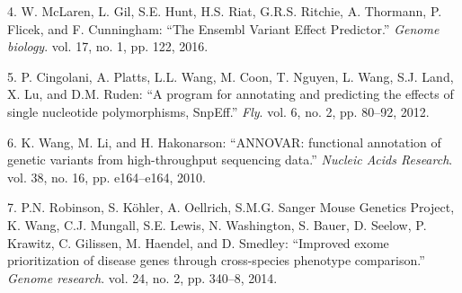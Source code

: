 \documentclass[12pt,twoside]{reedthesis}
\theoremstyle{definition}
\theoremstyle{definition}
\theoremstyle{remark}
\begin{document}
  \hypertarget{ref-McLaren2016}{}
  4. W. McLaren, L. Gil, S.E. Hunt, H.S. Riat, G.R.S. Ritchie, A.
  Thormann, P. Flicek, and F. Cunningham: ``The Ensembl Variant Effect
  Predictor.'' \emph{Genome biology}. vol. 17, no. 1, pp. 122, 2016.
  
  \hypertarget{ref-Cingolani2012}{}
  5. P. Cingolani, A. Platts, L.L. Wang, M. Coon, T. Nguyen, L. Wang, S.J.
  Land, X. Lu, and D.M. Ruden: ``A program for annotating and predicting
  the effects of single nucleotide polymorphisms, SnpEff.'' \emph{Fly}.
  vol. 6, no. 2, pp. 80--92, 2012.
  
  \hypertarget{ref-Wang2010}{}
  6. K. Wang, M. Li, and H. Hakonarson: ``ANNOVAR: functional annotation
  of genetic variants from high-throughput sequencing data.''
  \emph{Nucleic Acids Research}. vol. 38, no. 16, pp. e164--e164, 2010.
  
  \hypertarget{ref-Robinson2014}{}
  7. P.N. Robinson, S. Köhler, A. Oellrich, S.M.G. Sanger Mouse Genetics
  Project, K. Wang, C.J. Mungall, S.E. Lewis, N. Washington, S. Bauer, D.
  Seelow, P. Krawitz, C. Gilissen, M. Haendel, and D. Smedley: ``Improved
  exome prioritization of disease genes through cross-species phenotype
  comparison.'' \emph{Genome research}. vol. 24, no. 2, pp. 340--8, 2014.
  
\end{document}
